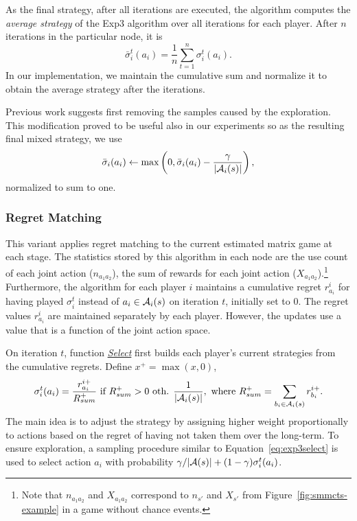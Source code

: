 As the final strategy, after all iterations are executed, the algorithm computes the \emph{average strategy} of the Exp3 algorithm over all iterations for each player. After $n$ iterations in the particular node, it is
\begin{equation}
\bar{\sigma}^t_i(a_i) = \frac{1}{n}\sum_{t=1}^n \sigma^t_i(a_i).
\end{equation}
In our implementation, we maintain the cumulative sum and normalize it to obtain the average strategy after the iterations.

Previous work \cite{Teytaud11Upper} suggests first removing the samples caused by the exploration.
This modification proved to be useful also in our experiments
so as the resulting final mixed strategy, we use
\begin{equation}
\bar{\sigma}_i(a_i) \leftarrow \max\left(0, \bar{\sigma}_i(a_i) - \frac{\gamma}{|\mathcal{A}_i(s)|}\right),
\end{equation}
normalized to sum to one.

\subsubsection{Regret Matching} \label{sec:rm}

This variant applies regret matching \cite{Hart00} to the current estimated matrix game at each stage. The statistics stored by this algorithm in each node are the use count of each joint action ($n_{a_1a_2}$), the sum of rewards for each joint action ($X_{a_1a_2}$).\footnote{Note that $n_{a_1a_2}$ and $X_{a_1a_2}$ correspond to $n_{s'}$ and $X_{s'}$ from Figure~\ref{fig:smmcts-example} in a game without chance events.}
Furthermore, the algorithm for each player $i$ maintains a cumulative regret $r^i_{a_i}$ for having played $\sigma_i^t$ instead of $a_i \in \mathcal{A}_i(s)$ on iteration $t$, initially set to 0. The regret values $r^i_{a_i}$ are maintained separately by each player. However, the updates use a value that is a function of the joint action space. 

On iteration $t$, function \emph{\underline{Select}} first builds
each player's current strategies from the cumulative regrets. Define $x^+ = \max(x,0)$,
\begin{equation}
\label{eq:rm}
\sigma^t_i(a_i) = \frac{r^{i+}_{a_i}}{R^+_{sum}} \mbox{ if } R^+_{sum} > 0 
\mbox{ oth. } \frac{1}{|\mathcal{A}_i(s)|}, \mbox{ where } R^+_{sum} = \sum_{b_i \in \mathcal{A}_i(s)}{r^{i+}_{b_i}}.
\end{equation}
The main idea is to adjust the strategy by assigning higher weight proportionally to actions based on the regret of having not taken them over the long-term.
To ensure exploration, a sampling procedure similar to Equation~\ref{eq:exp3select} is used to select action $a_i$ with probability 
$\gamma/|\mathcal{A}(s)| + (1-\gamma) \sigma^t_i(a_i)$.

